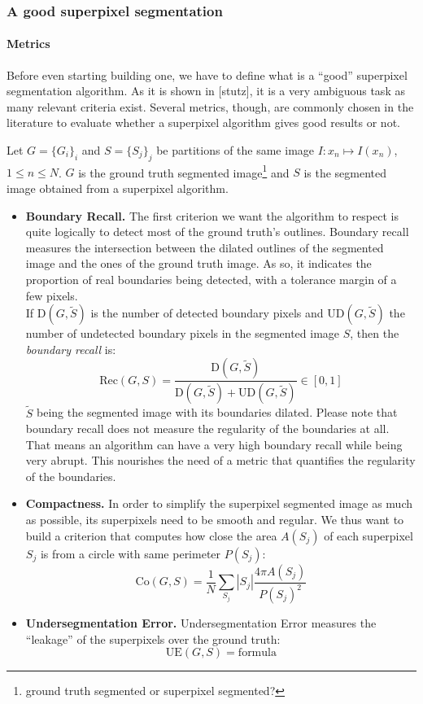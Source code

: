 \documentclass{article}
\begin{document}
        \subsubsection{A good superpixel segmentation}
            \paragraph{Metrics}
            Before even starting building one, we have to define what is a ``good'' superpixel segmentation algorithm. As it is shown in [stutz], it is a very ambiguous task as many relevant criteria exist. Several metrics, though, are commonly chosen in the literature to evaluate whether a superpixel algorithm gives good results or not.

            Let $G = \{G_i\}_i$ and $S = \{S_j\}_j$ be partitions of the same image $I : x_n \mapsto I(x_n)$, $1 \leq n \leq N$. $G$ is the ground truth segmented image\footnote{ground truth segmented or superpixel segmented?} and $S$ is the segmented image obtained from a superpixel algorithm.
            \begin{itemize}
                \item \textbf{Boundary Recall.} The first criterion we want the algorithm to respect is quite logically to detect most of the ground truth's outlines. Boundary recall measures the intersection between the dilated outlines of the segmented image and the ones of the ground truth image. As so, it indicates the proportion of real boundaries being detected, with a tolerance margin of a few pixels.\\
                If $\text{D}(G,\tilde{S})$ is the number of detected boundary pixels and $\text{UD}(G,\tilde{S})$ the number of undetected boundary pixels in the segmented image $S$, then the \textit{boundary recall} is:
                $$
                \mathrm{Rec}(G,S)=\frac{\mathrm{D}(G,\tilde{S})}{\mathrm{D}(G,\tilde{S})+\mathrm{UD}(G,\tilde{S})} \in [0,1]
                $$
                $\tilde{S}$ being the segmented image with its boundaries dilated. Please note that boundary recall does not measure the regularity of the boundaries at all. That means an algorithm can have a very high boundary recall while being very abrupt. This nourishes the need of a metric that quantifies the regularity of the boundaries.

                \item \textbf{Compactness.} In order to simplify the superpixel segmented image as much as possible, its superpixels need to be smooth and regular. We thus want to build a criterion that computes how close the area $A(S_j)$ of each superpixel $S_j$ is from a circle with same perimeter $P(S_j)$:
                $$
                \mathrm{Co}(G, S)=\frac{1}{N} \sum_{S_j}|S_j| \frac{4 \pi A(S_j)}{P(S_j)^2}
                $$

                \item \textbf{Undersegmentation Error.} Undersegmentation Error measures the ``leakage'' of the superpixels over the ground truth:
                $$
                \mathrm{UE}(G,S) = \text{formula}
                $$
            \end{itemize}
\end{document}
